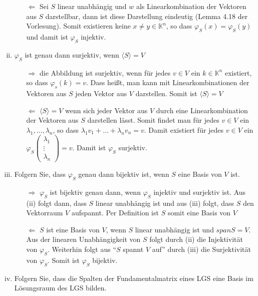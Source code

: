 \documentclass{article}
\begin{document}
\begin{enumerate}[(i)]
\begin{itemize}
  \item[$\Leftarrow$] Sei $S$ linear unabhängig und $w$ als Linearkombination der Vektoren aus $S$ darstellbar,
    dann ist diese Darstellung eindeutig (Lemma 4.18 der Vorlesung). Somit existieren keine
    $x \ne y \in \mathbb{K}^n$, so dass $\varphi_S(x) = \varphi_S(y)$ und damit ist $\varphi_S$
    injektiv.
  \end{itemize}
\item $\varphi_S$ ist genau dann surjektiv, wenn $\langle S \rangle = V$
  \begin{itemize}
  \item[$\Rightarrow$] die Abbildung ist surjektiv, wenn für jedes $v \in V$ ein $k \in \mathbb{K}^n$
    existiert, so dass $\varphi_s(k) = v$. Dass heißt, man kann mit Linearkombinationen der Vektoren aus
    $S$ jeden Vektor aus $V$ darstellen. Somit ist $\langle S \rangle = V$
  \item[$\Leftarrow$] $\langle S \rangle = V$ wenn sich jeder Vektor aus $V$ durch eine Linearkombination
    der Vektoren aus $S$ darstellen lässt. Somit findet man für jedes $v \in V$ ein $\lambda_1, \ldots, \lambda_n$,
    so dass $\lambda_1 v_1 + \ldots + \lambda_n v_n = v$. Damit existiert für jedes $v \in V$ ein
    $\varphi_S\begin{pmatrix} \lambda_1 \\ \vdots \\ \lambda_n \end{pmatrix} = v$. Damit ist $\varphi_S$ surjektiv.
    
  \end{itemize}
  
\item Folgern Sie, dass $\varphi_S$ genau dann bijektiv ist, wenn $S$ eine Basis von $V$ ist.
  \begin{itemize}
  \item[$\Rightarrow$]
    $\varphi_S$ ist bijektiv genau dann, wenn $\varphi_S$ injektiv und surjektiv ist. Aus (ii) folgt dann,
    dass $S$ linear unabhängig ist und aus (iii) folgt, dass $S$ den Vektorraum $V$ aufspannt.
    Per Definition ist $S$ somit eine Basis von $V$
  \item[$\Leftarrow$]
    $S$ ist eine Basis von $V$, wenn $S$ linear unabhängig ist und $span S = V$.
    Aus der linearen Unabhängigkeit von $S$ folgt durch (ii) die Injektivität von $\varphi_S$.
    Weiterhin folgt aus ``$S$ spannt $V$ auf'' durch (iii) die Surjektivität von  $\varphi_S$.
    Somit ist $\varphi_S$ bijektiv.
  \end{itemize}
\item Folgern Sie, dass die Spalten der Fundamentalmatrix eines LGS eine Basis im Lösungsraum des LGS bilden. \\
  
\end{enumerate}
\end{document}
